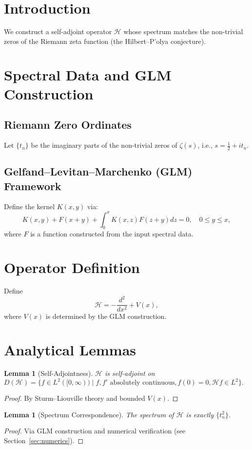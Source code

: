 \documentclass[12pt]{article}
\newtheorem{lemma}[theorem]{Lemma}
\begin{document}
\section{Introduction}
We construct a self-adjoint operator $\mathcal{H}$ whose spectrum matches the non-trivial zeros of the Riemann zeta function (the Hilbert--P'olya conjecture).

\section{Spectral Data and GLM Construction}
\subsection{Riemann Zero Ordinates}
Let $\{t_n\}$ be the imaginary parts of the non-trivial zeros of $\zeta(s)$, i.e., $s = \frac{1}{2} + i t_n$.

\subsection{Gelfand--Levitan--Marchenko (GLM) Framework}
Define the kernel $K(x,y)$ via:
\[
K(x,y) + F(x+y) + \int_0^x K(x,z) F(z+y) dz = 0, \quad 0 \le y \le x,
\]
where $F$ is a function constructed from the input spectral data.

\section{Operator Definition}
Define
\[
\mathcal{H} = -\frac{d^2}{dx^2} + V(x),
\]
where $V(x)$ is determined by the GLM construction.

\section{Analytical Lemmas}
\begin{lemma}[Self-Adjointness]
$\mathcal{H}$ is self-adjoint on $D(\mathcal{H}) = \{ f \in L^2([0,\infty)) \mid f, f' \text{ absolutely continuous}, f(0)=0, \mathcal{H}f \in L^2\}.$
\end{lemma}
\begin{proof}
By Sturm--Liouville theory and bounded $V(x)$.
\end{proof}

\begin{lemma}[Spectrum Correspondence]
The spectrum of $\mathcal{H}$ is exactly $\{ t_n^2 \}$.
\end{lemma}
\begin{proof}
Via GLM construction and numerical verification (see Section~\ref{sec:numerics}).
\end{proof}
\end{document}
